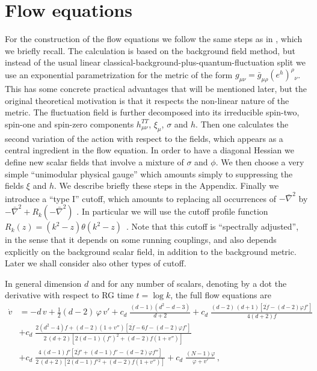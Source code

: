 \documentclass[11pt,draft]{book} %
\newcommand{\bnabla}{\bar\nabla}
\begin{document}
\section{Flow equations}

For the construction of the flow equations we follow the same steps
as in \cite{Percacci:2015wwa}, which we briefly recall.
The calculation is based on the background field method,
but instead of the usual linear classical-background-plus-quantum-fluctuation split we
use an exponential parametrization
for the metric of the form
$g_{\mu\nu}=\bar g_{\mu\rho}(e^h)^\rho{}_\nu$.
This has some concrete practical advantages that will be
mentioned later,
but the original theoretical motivation is that it
respects the non-linear nature of the metric.
The fluctuation field is further decomposed into its irreducible
spin-two, spin-one and spin-zero components $h_{\mu\nu}^{TT}$,
$\xi_\mu$, $\sigma$ and $h$.
Then one calculates the second variation of the action with
respect to the fields, which appears as a central ingredient
in the flow equation.
In order to have a diagonal Hessian we define new scalar fields
that involve a mixture of $\sigma$ and $\phi$.
We then choose a very simple ``unimodular physical gauge''
which amounts simply to suppressing the fields $\xi$ and $h$.
We describe briefly these steps in the Appendix.
Finally we introduce a ``type I'' cutoff, which amounts to replacing
all occurrences of $-\bnabla^2$ by $-\bnabla^2+R_k(-\bnabla^2)$
\cite{Codello:2008vh}.
In particular we will use the cutoff profile function
$R_k(z)=\left(k^2-z\right)\theta\left(k^2-z\right)$~\cite{Litim:2001up}.
Note that this cutoff is ``spectrally adjusted'',
in the sense that it depends on some running couplings,
and also depends explicitly on the background scalar field,
in addition to the background metric.
Later we shall consider also other types of cutoff.

In general dimension $d$ and for any number of scalars,
denoting by a dot the derivative with respect to RG time $t=\log k$,
the full flow equations are
\begin{align}
  \dot v &= - d \, v + \frac{1}{2} (d-2) \, \varphi \, v'
    + c_d \; \frac{(d-1) \left( d^2 - d - 3 \right)} {d+2}
    + c_d \; \frac{ (d-2) \, (d+1) \left[ 2 \dot f - (d-2) \varphi f' \right] }{4 \left( d+2 \right) f} \nonumber \\[3mm]
  & + c_d \; \frac{ 2 \left( d^2 - 4 \right) f + (d - 2) \left( 1 + v'' \right) \left[ 2 \dot f - 6 f - (d - 2) \varphi f' \right] }
                  { 2 \, (d+2) \left[ 2 (d-1) \left( f' \right)^2 + (d-2) f \left( 1 + v'' \right) \right] } \nonumber \\[3mm]
  & + c_d \; \frac{ 4 \, (d - 1) f' \left[ 2 \dot f' + (d - 1) f' - (d - 2) \varphi f'' \right] }
                  { 2 \, (d+2) \left[ 2 (d-1) f'{}^2 + (d-2) f \left( 1 + v'' \right) \right] }
    + c_d \; \frac{(N-1)\varphi}{\varphi+v'} \,,
  \label{flowvfull}
\end{align}
\end{document}
